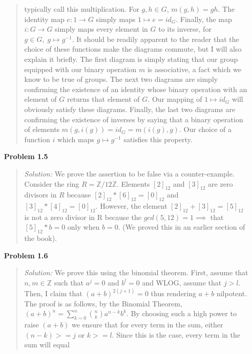 \documentclass{article}
\newcommand{\Solution}{\textit{Solution: }}
\begin{document}
\begin{enumerate}
\begin{quote}
                typically call this multiplication. For $g, h \in G$, $m(g, h) = gh$. The identity map $e:1 \to G$ simply maps 
                $1 \mapsto e = id_G$. Finally, the map $i: G \to G$ simply maps every element in $G$ to its inverse, for $g \in G, \;
                g \mapsto g^{-1}$. It should be readily apparent to the reader that the choice of these functions make the diagrams
                commute, but I will also explain it briefly. The first diagram is simply stating that our group equipped with our binary
                operation $m$ is associative, a fact which we know to be true of groups. The next two diagrams are simply confirming the
                existence of an identity whose binary operation with an element of $G$ returns that element of $G$. Our mapping of $1 \mapsto
                id_G$ will obviously satisfy these diagrams. Finally, the last two diagrams are confirming the existence of inverses by saying
                that a binary operation of elements $m(g, i(g)) = id_G = m(i(g), g)$. Our choice of a function $i$ which maps $g \mapsto g^{-1}$
                satisfies this property. \qedsymbol
            \end{quote}
        \item[\textbf{Problem 1.5}]
            \begin{quote}
                \Solution We prove the assertion to be false via a counter-example. Consider the ring $R = \mathbb{Z}/12\mathbb{Z}$. Elements $[2]_{12}$
                and $[3]_{12}$ are zero divisors in $R$ because $[2]_{12}*[6]_{12} = [0]_{12}$ and $[3]_{12}*[4]_{12} = [0]_{12}$. However,
                the element $[2]_{12}+[3]_{12} = [5]_{12}$ is not a zero divisor in R because the $gcd(5, 12) = 1 \implies$ that $[5]_{12}*b = 0$
                only when $b = 0$. (We proved this in an earlier section of the book). \qedsymbol
            \end{quote}
        \item[\textbf{Problem 1.6}]
            \begin{quote}
                \Solution We prove this using the binomial theorem. First, assume that $n, m \in \mathbb{Z}$ such that $a^j = 0$ and $b^l = 0$
                and WLOG, assume that $j > l$. Then, I claim that $(a + b)^{2(j+1)} = 0$ thus rendering $a + b$ nilpotent. The proof is as follows,
                by the Binomial Theorem, $(a + b)^{n} = \sum_{k = 0}^{n} \binom{n}{k}a^{n-k}b^k$. By choosing such a high power to raise $(a + b)$
                we ensure that for every term in the sum, either $(n - k) >= j$ or $k >= l$. Since this is the case, every term in the sum will equal

\end{quote}
\end{enumerate}
\end{document}
